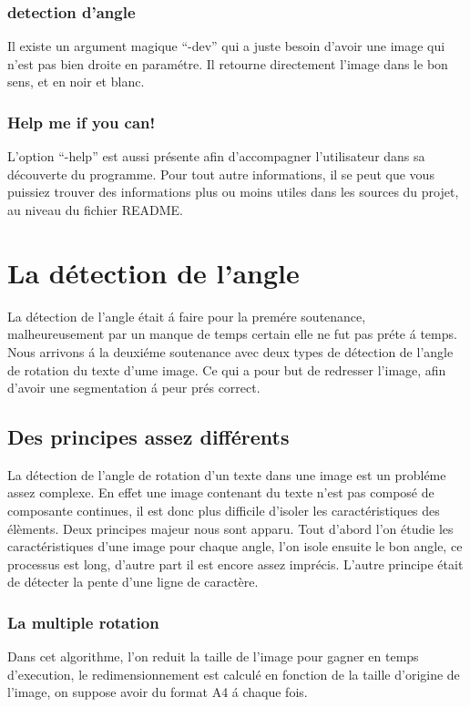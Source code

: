 \subsection{ detection d'angle}
 Il existe un argument magique ``-dev'' qui a juste besoin d'avoir une
 image qui n'est pas bien droite en param\'etre. Il retourne directement
 l'image dans le bon sens, et en noir et blanc.
\subsection{ Help me if you can! }
 L'option ``-help'' est aussi pr\'esente afin d'accompagner
 l'utilisateur dans sa d\'ecouverte du programme. Pour tout autre
 informations, il se peut que vous puissiez trouver des informations
 plus ou moins utiles dans les sources du projet, au niveau du fichier
 README.


\chapter{ La d\'etection de l'angle }
 La d\'etection de l'angle \'etait \'a faire pour la prem\'ere
 soutenance, malheureusement par un manque de temps certain elle ne fut
 pas pr\'ete \'a temps. Nous arrivons \'a la deuxi\'eme soutenance avec
 deux types de d\'etection de l'angle de rotation du texte d'ume image.
 Ce qui a pour but de redresser l'image, afin d'avoir une segmentation
 \'a peur pr\'es correct.

\section{ Des principes assez diff\'erents}
 La d\'etection de l'angle de rotation d'un texte dans une image est un
 probl\'eme assez complexe. En effet une image contenant du texte n'est
 pas compos\'e de composante continues, il est donc plus difficile d'isoler
 les caract\'eristiques des \'el\`ements. Deux principes majeur nous
 sont apparu. Tout d'abord l'on \'etudie les caract\'eristiques d'une
 image pour chaque angle, l'on isole ensuite le bon angle, ce
 processus est long, d'autre part il est encore assez impr\'ecis.
 L'autre principe \'etait de d\'etecter la pente d'une ligne de caract\`ere.
\subsection{ La multiple rotation }
 Dans cet algorithme, l'on reduit la taille de l'image pour gagner en
 temps d'execution, le redimensionnement est calcul\'e en fonction de la
 taille d'origine de l'image, on suppose avoir du format A4 \'a chaque
 fois.

